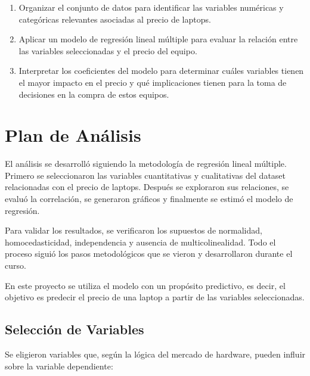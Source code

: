 \documentclass[12pt,a4paper]{article}
\begin{document}
\begin{enumerate}[leftmargin=2cm]
    \item Organizar el conjunto de datos para identificar las variables numéricas y categóricas relevantes asociadas al precio de laptops.
    
    \item Aplicar un modelo de regresión lineal múltiple para evaluar la relación entre las variables seleccionadas y el precio del equipo.
    
    \item Interpretar los coeficientes del modelo para determinar cuáles variables tienen el mayor impacto en el precio y qué implicaciones tienen para la toma de decisiones en la compra de estos equipos.
\end{enumerate}



\section{Plan de Análisis}

El análisis se desarrolló siguiendo la metodología de regresión lineal múltiple. Primero se seleccionaron las variables cuantitativas y cualitativas del dataset relacionadas con el precio de laptops. Después se exploraron sus relaciones, se evaluó la correlación, se generaron gráficos y finalmente se estimó el modelo de regresión.

Para validar los resultados, se verificaron los supuestos de normalidad, homocedasticidad, independencia y ausencia de multicolinealidad. Todo el proceso siguió los pasos metodológicos que se vieron y desarrollaron durante el curso.

En este proyecto se utiliza el modelo con un propósito predictivo, es decir, el objetivo es predecir el precio de una laptop a partir de las variables seleccionadas.

\subsection{Selección de Variables}

Se eligieron variables que, según la lógica del mercado de hardware, pueden influir sobre la variable dependiente:
\end{document}
